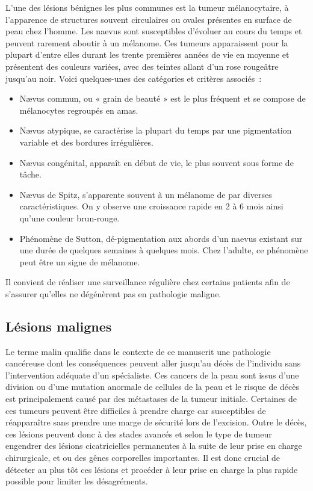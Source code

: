 L'une des lésions bénignes les plus communes est la tumeur mélanocytaire, à l’apparence de structures souvent circulaires ou ovales présentes en surface de peau chez l’homme. Les naevus sont susceptibles d’évoluer au cours du temps et peuvent rarement aboutir à un mélanome. Ces tumeurs apparaissent pour la plupart d'entre elles durant les trente premières années de vie en moyenne et présentent des couleurs variées, avec des teintes allant d'un rose rougeâtre jusqu'au noir. Voici quelques-unes des catégories et critères associés~:
\begin{itemize}
    \item Nævus commun, ou « grain de beauté » est le plus fréquent et se compose de mélanocytes regroupés en amas.
    \item Nævus atypique, se caractérise la plupart du temps par une pigmentation variable et des bordures irrégulières.
    \item Nævus congénital, apparaît en début de vie, le plus souvent sous forme de tâche.
    \item Nævus de Spitz, s’apparente souvent à un mélanome de par diverses caractéristiques. On y observe une croissance rapide en 2 à 6 mois ainsi qu’une couleur brun-rouge.
    \item Phénomène de Sutton, dé-pigmentation aux abords d’un naevus existant sur une durée de quelques semaines à quelques mois. Chez l’adulte, ce phénomène peut être un signe de mélanome.
\end{itemize}
Il convient de réaliser une surveillance régulière chez certains patients afin de s'assurer qu'elles ne dégénèrent pas en pathologie maligne.\par

\subsection{Lésions malignes}
Le terme malin qualifie dans le contexte de ce manuscrit une pathologie cancéreuse dont les conséquences peuvent aller jusqu'au décès de l'individu sans l'intervention adéquate d'un spécialiste. Ces cancers de la peau sont issus d’une division ou d’une mutation anormale de cellules de la peau et le risque de décès est principalement causé par des métastases de la tumeur initiale. Certaines de ces tumeurs peuvent être difficiles à prendre charge car susceptibles de réapparaître sans prendre une marge de sécurité lors de l'excision. Outre le décès, ces lésions peuvent donc à des stades avancés et selon le type de tumeur engendrer des lésions cicatricielles permanentes à la suite de leur prise en charge chirurgicale, et ou des gênes corporelles importantes. Il est donc crucial de détecter au plus tôt ces lésions et procéder à leur prise en charge la plus rapide possible pour limiter les désagréments.\par

